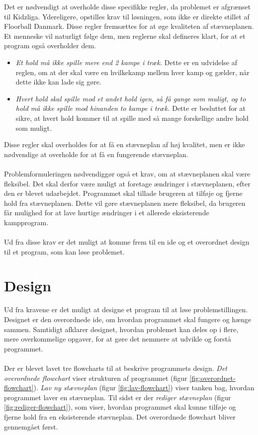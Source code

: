 Det er nødvendigt at overholde disse specifikke regler, da problemet er afgrænset til Kidzliga. Ydereligere, opstilles krav til løsningen, som ikke er direkte stillet af Floorball Danmark. Disse regler fremsættes for at øge kvaliteten af stævneplanen. Et menneske vil naturligt følge dem, men reglerne skal defineres klart, for at et program også overholder dem.
\begin{itemize}
    \item \textit{Et hold må ikke spille mere end 2 kampe i træk.} Dette er en udvidelse af reglen, om at der skal være en hvilkekamp mellem hver kamp og gælder, når dette ikke kan lade sig gøre. 
    \item \textit{Hvert hold skal spille mod et andet hold igen, så få gange som muligt, og to hold må ikke spille mod hinanden to kampe i træk.} Dette er besluttet for at sikre, at hvert hold kommer til at spille med så mange forskellige andre hold som muligt.
\end{itemize}
Disse regler skal overholdes for at få en stævneplan af høj kvalitet, men er ikke nødvendige at overholde for at få en fungerende stævneplan.
\\\\
Problemformuleringen nødvendiggør også et krav, om at stævneplanen skal være fleksibel. Det skal derfor være muligt at foretage ændringer i stævneplanen, efter den er blevet udarbejdet. Programmet skal tillade brugeren at tilføje og fjerne hold fra stævneplanen. Dette vil gøre stævneplanen mere fleksibel, da brugeren får mulighed for at lave hurtige ændringer i et allerede eksisterende kampprogram.
\\\\
Ud fra disse krav er det muligt at komme frem til en ide og et overordnet design til et program, som kan løse problemet. 

\section{Design}
Ud fra kravene er det muligt at designe et program til at løse problemstillingen. Designet er den overordnede ide, om hvordan programmet skal fungere og hænge sammen. Samtidigt afklarer designet, hvordan problemet kan deles op i flere, mere overkommelige opgaver, for at gøre det nemmere at udvikle og forstå programmet. 
\\\\
Der er blevet lavet tre flowcharts til at beskrive programmets design. \textit{Det overordnede flowchart} viser strukturen af programmet (figur \ref{fig:overordnet-flowchart}). \textit{Lav ny stævneplan} (figur \ref{fig:lav-flowchart}) viser tanken bag, hvordan programmet laver en stævneplan. Til sidst er der \textit{rediger stævneplan} (figur \ref{fig:rediger-flowchart}), som viser, hvordan programmet skal kunne tilføje og fjerne hold fra en eksisterende stævneplan. Det overordnede flowchart bliver gennemgået først.

